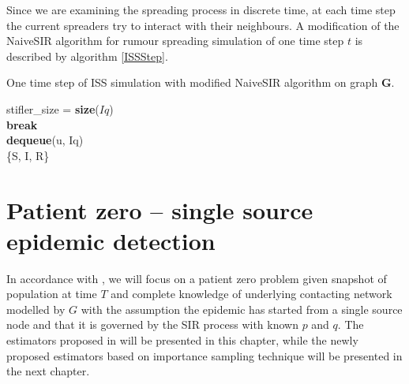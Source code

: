 \documentclass[times, utf8, diplomski]{fer}
\begin{document}
Since we are examining the spreading process in discrete time, at each time step the current spreaders try to interact with their neighbours. A modification of the NaiveSIR algorithm for rumour spreading simulation of one time step $t$ is described by algorithm \ref{ISSStep}. 
 
\begin{algorithm}
\caption{One time step of ISS simulation with modified NaiveSIR algorithm on graph $\mathbf{G}$.}
 \label{ISSStep}
 stifler\_size = \textbf{size}($Iq$)\\
  {
  {
 \textbf{break}\\
 }
 \textbf{dequeue}(u, Iq)\\
  }
  \Return \{S, I, R\}
\end{algorithm}

\chapter{Patient zero -- single source epidemic detection}
\label{PZ}

In accordance with \cite{Nino}, we will focus on a patient zero problem given snapshot of population at time $T$ and complete knowledge of underlying contacting network modelled by $G$ with the assumption the epidemic has started from a single source node and that it is governed by the SIR process with known $p$ and $q$.  The estimators proposed in \cite{Nino} will be presented in this chapter, while the newly proposed estimators based on importance sampling  technique will be presented in the next chapter.
\end{document}
